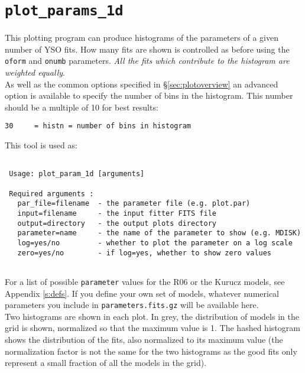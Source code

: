 \documentclass[letterpaper,11pt]{report}
\begin{document}
\section{\texttt{plot\_params\_1d}}

This plotting program can produce histograms of the parameters of a given number of YSO fits. How many fits are shown is controlled as before using the \texttt{oform} and \texttt{onumb} parameters. \emph{All the fits which contribute to the histogram are weighted equally}. \\

As well as the common options specified in \S\ref{sec:plotoverview} an advanced option is available to specify the number of bins in the histogram. This number should be a multiple of 10 for best results:

\begin{verbatim}
30     = histn = number of bins in histogram 
\end{verbatim}

This tool is used as:\\

\begin{Verbatim}[frame=single,label=Syntax]

 Usage: plot_param_1d [arguments]
 
 Required arguments :
   par_file=filename  - the parameter file (e.g. plot.par)
   input=filename     - the input fitter FITS file
   output=directory   - the output plots directory
   parameter=name     - the name of the parameter to show (e.g. MDISK)
   log=yes/no         - whether to plot the parameter on a log scale
   zero=yes/no        - if log=yes, whether to show zero values
 
\end{Verbatim}

For a list of possible \texttt{parameter} values for the R06 or the Kurucz models, see Appendix \ref{s:defs}. If you define your own set of models, whatever numerical parameters you include in \texttt{parameters.fits.gz} will be available here.\\

Two histograms are shown in each plot. In grey, the distribution of models in the grid is shown, normalized so that the maximum value is 1. The hashed histogram shows the distribution of the fits, also normalized to its maximum value (the normalization factor is not the same for the two histograms as the good fits only represent a small fraction of all the models in the grid).\\
\end{document}
